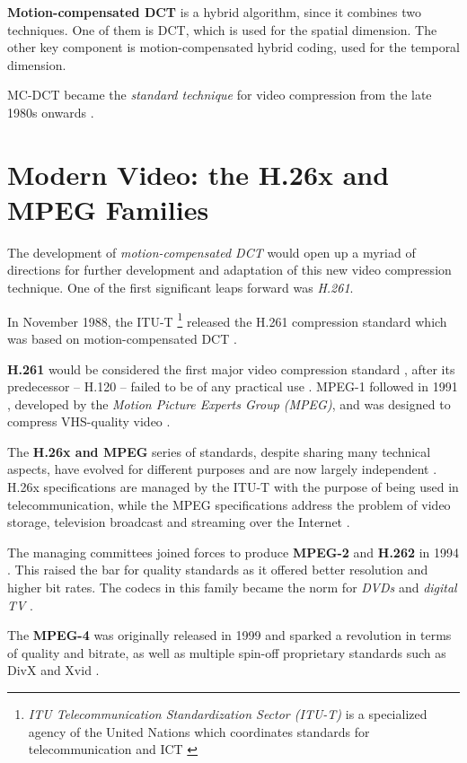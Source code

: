 \textbf{Motion-compensated DCT} \cite{wiki:Video_coding_format} is a hybrid algorithm, since it combines two techniques. One of them is DCT, which is used for the spatial dimension.
The other key component is motion-compensated hybrid coding, used for the temporal dimension.

MC-DCT became the \emph{standard technique} for video compression from the late 1980s onwards \cite{wiki:Video_coding_format}.

\section{Modern Video: the H.26x and MPEG Families}
The development of \emph{motion-compensated DCT} would open up a myriad of directions for further development and adaptation of this new video compression technique.
One of the first significant leaps forward was \emph{H.261}.

In November 1988, the ITU-T
\footnote{\emph{ITU Telecommunication Standardization Sector (ITU-T)} is a specialized agency of the United Nations which coordinates standards for telecommunication and ICT \cite{wiki:ITU-T}}
released the H.261 compression standard \cite{wiki:H.261} which was based on motion-compensated DCT \cite{ghanbari_2003}.

\textbf{H.261} would be considered the first major video compression standard \cite{real_timeline}, after its predecessor -- H.120 -- failed to be of any practical use \cite{real_timeline}.
MPEG-1 followed in 1991 \cite{real_timeline}, developed by the \emph{Motion Picture Experts Group (MPEG)}, and was designed to compress VHS-quality video \cite{real_timeline}.

The \textbf{H.26x and MPEG} series of standards, despite sharing many technical aspects, have evolved for different purposes and are now largely independent \cite{ghanbari_2003}.
H.26x specifications are managed by the ITU-T with the purpose of being used in telecommunication, while the MPEG specifications address the problem of video storage, television broadcast and streaming over the Internet \cite{ghanbari_2003}.

The managing committees joined forces to produce \textbf{MPEG-2} and \textbf{H.262} in 1994 \cite{real_timeline}.
This raised the bar for quality standards as it offered better resolution and higher bit rates.
The codecs in this family became the norm for \emph{DVDs} and \emph{digital TV} \cite{real_timeline}.

The \textbf{MPEG-4} was originally released in 1999 \cite{real_timeline} and sparked a revolution in terms of quality and bitrate, as well as multiple spin-off proprietary standards such as DivX and Xvid \cite{real_timeline}.

